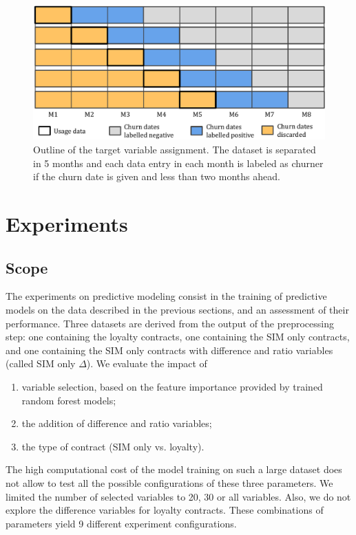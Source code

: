 \begin{figure}
    \centering
	\includegraphics[width=0.9\linewidth]{figures/data_range.pdf}
	\caption{Outline of the target variable assignment. The dataset is separated
	in 5 months and each data entry in each month is labeled as churner if the
	churn date is given and less than two months ahead.}
	\label{fig:data_separated}
\end{figure}

\section{Experiments}
\label{sec:churn_exp}

\subsection{Scope}

The experiments on predictive modeling consist in the training of predictive
models on the data described in the previous sections, and an assessment of
their performance. Three datasets are derived from the output of the
preprocessing step: one containing the loyalty contracts, one containing the SIM
only contracts, and one containing the SIM only contracts with difference and
ratio variables (called SIM only $\Delta$). We evaluate the impact of

\begin{enumerate}
    \item variable selection, based on the feature importance provided by
    trained random forest models;
    \item the addition of difference and ratio variables;
    \item the type of contract (SIM only vs. loyalty).
\end{enumerate}

The high computational cost of the model training on such a large dataset does
not allow to test all the possible configurations of these three parameters. We
limited the number of selected variables to 20, 30 or all variables. Also, we do
not explore the difference variables for loyalty contracts. These
combinations of parameters yield 9 different experiment configurations.


